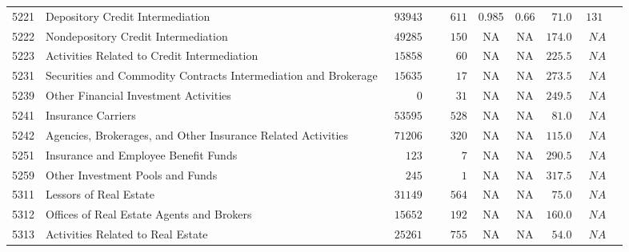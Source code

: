 \documentclass[9pt, oneside]{article}   	%
\begin{document}
\begin{longtable}{lp{3 in}ccccccc}
5221  & Depository Credit Intermediation & $\phantom{0}93943$ & $\phantom{000}611$ & 0.985 &  0.66 & $\phantom{0}71.0$ & $131$ \\
5222  & Nondepository Credit Intermediation & $\phantom{0}49285$ & $\phantom{000}150$ &    NA &    NA & $174.0$ & $\phantom{0}NA$ \\
5223  & Activities Related to Credit Intermediation & $\phantom{0}15858$ & $\phantom{0000}60$ &    NA &    NA & $225.5$ & $\phantom{0}NA$ \\
5231  & Securities and Commodity Contracts Intermediation and Brokerage & $\phantom{0}15635$ & $\phantom{0000}17$ &    NA &    NA & $273.5$ & $\phantom{0}NA$ \\
5239  & Other Financial Investment Activities & $\phantom{00000}0$ & $\phantom{0000}31$ &    NA &    NA & $249.5$ & $\phantom{0}NA$ \\
5241  & Insurance Carriers & $\phantom{0}53595$ & $\phantom{000}528$ &    NA &    NA & $\phantom{0}81.0$ & $\phantom{0}NA$ \\
5242  & Agencies, Brokerages, and Other Insurance Related Activities & $\phantom{0}71206$ & $\phantom{000}320$ &    NA &    NA & $115.0$ & $\phantom{0}NA$ \\
5251  & Insurance and Employee Benefit Funds & $\phantom{000}123$ & $\phantom{00000}7$ &    NA &    NA & $290.5$ & $\phantom{0}NA$ \\
5259  & Other Investment Pools and Funds & $\phantom{000}245$ & $\phantom{00000}1$ &    NA &    NA & $317.5$ & $\phantom{0}NA$ \\

5311  & Lessors of Real Estate & $\phantom{0}31149$ & $\phantom{000}564$ &    NA &    NA & $\phantom{0}75.0$ & $\phantom{0}NA$ \\
5312  & Offices of Real Estate Agents and Brokers & $\phantom{0}15652$ & $\phantom{000}192$ &    NA &    NA & $160.0$ & $\phantom{0}NA$ \\
5313  & Activities Related to Real Estate & $\phantom{0}25261$ & $\phantom{000}755$ &    NA &    NA & $\phantom{0}54.0$ & $\phantom{0}NA$ \\


\end{longtable}
\end{document}
